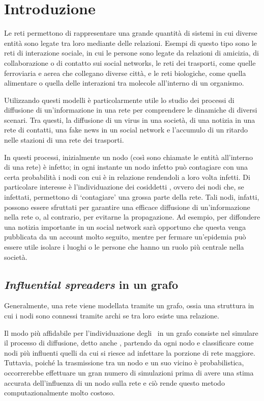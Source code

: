 \chapter{Introduzione}

Le reti permettono di rappresentare una grande quantità di sistemi in cui diverse entità 
sono legate tra loro mediante delle relazioni.
Esempi di questo tipo sono le reti di interazione sociale, in cui le persone sono legate 
da relazioni di amicizia, di collaborazione o di contatto sui social networks, 
le reti dei trasporti, come quelle ferroviaria e aerea
che collegano diverse città, e le reti biologiche, come quella alimentare o
quella delle interazioni tra molecole all'interno di un organismo.

Utilizzando questi modelli è particolarmente utile lo studio dei processi di diffusione
di un'informazione in una rete per comprendere le dinamiche di diversi scenari.
Tra questi, la diffusione di un virus in una società, di una notizia in una rete di contatti, 
una fake news in un social network e l'accumulo di un ritardo nelle stazioni di una rete 
dei trasporti.

In questi processi, inizialmente un nodo (così sono chiamate le entità all'interno di una rete) 
è infetto; in ogni instante un nodo infetto può contagiare con una certa probabilità i 
nodi con cui è in relazione rendendoli a loro volta infetti.
Di particolare interesse è l'individuazione dei cosiddetti \infsp, ovvero dei nodi
che, se infettati, permettono di `contagiare' una grossa parte della rete.
Tali nodi, infatti, possono essere sfruttati per garantire una efficace diffusione 
di un'informazione nella rete o, al contrario, per evitarne la propagazione.
Ad esempio, per diffondere una notizia importante in un social network sarà opportuno che 
questa venga pubblicata da un account molto seguito, mentre per fermare un'epidemia 
può essere utile isolare i luoghi o le persone che hanno un ruolo più centrale
nella società.


\section{\textit{Influential spreaders} in un grafo}

Generalmente, una rete viene modellata tramite un grafo, ossia una struttura in cui i 
nodi sono connessi tramite archi se tra loro esiste una relazione.

Il modo più affidabile per l'individuazione degli \infsp\ in un grafo consiste nel 
simulare il processo di diffusione, detto anche \spproc, partendo da ogni nodo e 
classificare come nodi più 
influenti quelli da cui si riesce ad infettare la porzione di rete maggiore.
Tuttavia, poiché la trasmissione tra un nodo e un suo vicino è probabilistica,
occorrerebbe effettuare un gran numero di simulazioni prima di avere una stima accurata 
dell'influenza di un nodo sulla rete e ciò rende questo metodo computazionalmente 
molto costoso.

